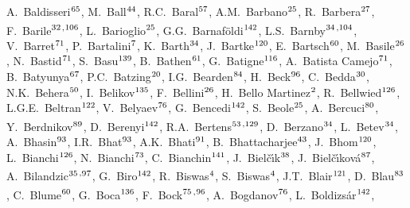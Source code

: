 \begin{flushleft}
A.~Baldisseri$^\textrm{\scriptsize 65}$,
M.~Ball$^\textrm{\scriptsize 44}$,
R.C.~Baral$^\textrm{\scriptsize 57}$,
A.M.~Barbano$^\textrm{\scriptsize 25}$,
R.~Barbera$^\textrm{\scriptsize 27}$,
F.~Barile$^\textrm{\scriptsize 32}$\textsuperscript{,}$^\textrm{\scriptsize 106}$,
L.~Barioglio$^\textrm{\scriptsize 25}$,
G.G.~Barnaf\"{o}ldi$^\textrm{\scriptsize 142}$,
L.S.~Barnby$^\textrm{\scriptsize 34}$\textsuperscript{,}$^\textrm{\scriptsize 104}$,
V.~Barret$^\textrm{\scriptsize 71}$,
P.~Bartalini$^\textrm{\scriptsize 7}$,
K.~Barth$^\textrm{\scriptsize 34}$,
J.~Bartke$^\textrm{\scriptsize 120}$,
E.~Bartsch$^\textrm{\scriptsize 60}$,
M.~Basile$^\textrm{\scriptsize 26}$,
N.~Bastid$^\textrm{\scriptsize 71}$,
S.~Basu$^\textrm{\scriptsize 139}$,
B.~Bathen$^\textrm{\scriptsize 61}$,
G.~Batigne$^\textrm{\scriptsize 116}$,
A.~Batista Camejo$^\textrm{\scriptsize 71}$,
B.~Batyunya$^\textrm{\scriptsize 67}$,
P.C.~Batzing$^\textrm{\scriptsize 20}$,
I.G.~Bearden$^\textrm{\scriptsize 84}$,
H.~Beck$^\textrm{\scriptsize 96}$,
C.~Bedda$^\textrm{\scriptsize 30}$,
N.K.~Behera$^\textrm{\scriptsize 50}$,
I.~Belikov$^\textrm{\scriptsize 135}$,
F.~Bellini$^\textrm{\scriptsize 26}$,
H.~Bello Martinez$^\textrm{\scriptsize 2}$,
R.~Bellwied$^\textrm{\scriptsize 126}$,
L.G.E.~Beltran$^\textrm{\scriptsize 122}$,
V.~Belyaev$^\textrm{\scriptsize 76}$,
G.~Bencedi$^\textrm{\scriptsize 142}$,
S.~Beole$^\textrm{\scriptsize 25}$,
A.~Bercuci$^\textrm{\scriptsize 80}$,
Y.~Berdnikov$^\textrm{\scriptsize 89}$,
D.~Berenyi$^\textrm{\scriptsize 142}$,
R.A.~Bertens$^\textrm{\scriptsize 53}$\textsuperscript{,}$^\textrm{\scriptsize 129}$,
D.~Berzano$^\textrm{\scriptsize 34}$,
L.~Betev$^\textrm{\scriptsize 34}$,
A.~Bhasin$^\textrm{\scriptsize 93}$,
I.R.~Bhat$^\textrm{\scriptsize 93}$,
A.K.~Bhati$^\textrm{\scriptsize 91}$,
B.~Bhattacharjee$^\textrm{\scriptsize 43}$,
J.~Bhom$^\textrm{\scriptsize 120}$,
L.~Bianchi$^\textrm{\scriptsize 126}$,
N.~Bianchi$^\textrm{\scriptsize 73}$,
C.~Bianchin$^\textrm{\scriptsize 141}$,
J.~Biel\v{c}\'{\i}k$^\textrm{\scriptsize 38}$,
J.~Biel\v{c}\'{\i}kov\'{a}$^\textrm{\scriptsize 87}$,
A.~Bilandzic$^\textrm{\scriptsize 35}$\textsuperscript{,}$^\textrm{\scriptsize 97}$,
G.~Biro$^\textrm{\scriptsize 142}$,
R.~Biswas$^\textrm{\scriptsize 4}$,
S.~Biswas$^\textrm{\scriptsize 4}$,
J.T.~Blair$^\textrm{\scriptsize 121}$,
D.~Blau$^\textrm{\scriptsize 83}$,
C.~Blume$^\textrm{\scriptsize 60}$,
G.~Boca$^\textrm{\scriptsize 136}$,
F.~Bock$^\textrm{\scriptsize 75}$\textsuperscript{,}$^\textrm{\scriptsize 96}$,
A.~Bogdanov$^\textrm{\scriptsize 76}$,
L.~Boldizs\'{a}r$^\textrm{\scriptsize 142}$,

\end{flushleft}
